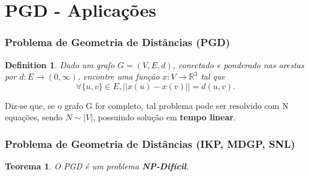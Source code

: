 \documentclass{beamer}
\newtheorem{definicao}{Definition}
\newtheorem{teo}{Teorema}
\begin{document}
\section{PGD - Aplicações}
\begin{frame}
\frametitle{\normalsize Problema de Geometria de Distâncias (PGD)}

\vspace{-1cm}
\begin{definicao}
	Dado um grafo $G = (V, E, d)$, conectado e ponderado nas arestas por $d: E \rightarrow (0, \infty)$, encontre uma função $x: V \rightarrow \mathbb{R}^3$ tal que
	$$\forall \{u, v\} \in E, ||x(u) - x(v)|| = d(u,v).$$
\end{definicao}

\vspace{1cm}
Diz-se que, se o grafo G for completo, tal problema pode ser resolvido com N equações, sendo $N \sim |V|$, possuindo solução em \textbf{tempo linear}.
\end{frame}

\begin{frame}
\frametitle{\normalsize Problema de Geometria de Distâncias (IKP, MDGP, SNL)}
\vspace{-0.5cm}
\begin{figure}
	\hspace{0.3cm}
\end{figure}
\vspace{-0.5cm}
\begin{teo}
	\centering
	O PGD é um problema \textbf{NP-Difícil}.
\end{teo}
\end{frame}
\end{document}
